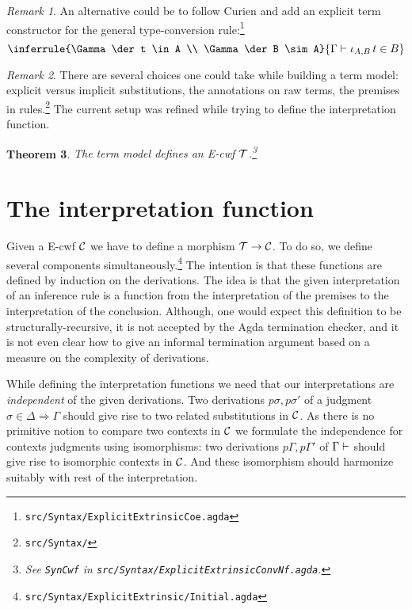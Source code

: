 \documentclass{amsart}
\theoremstyle{plain}
\newtheorem{theorem}{Theorem}[section]
\theoremstyle{definition}
\theoremstyle{remark}
\newtheorem{remark}[theorem]{Remark}
\begin{document}
\begin{remark}
  An alternative could be to follow Curien and add an explicit term
  constructor for the general type-conversion
  rule:\footnote{\texttt{src/Syntax/ExplicitExtrinsicCoe.agda}}
  \[
    \inferrule {\Gamma \der t \in A \\ \Gamma \der B \sim A}
    {\Gamma \der \iota_{A,B}\,t \in B}
  \]
\end{remark}

\begin{remark}
  There are several choices one could take while building a term
  model: explicit versus implicit substitutions, the annotations on
  raw terms, the premises in rules.\footnote{\texttt{src/Syntax/}} The
  current setup was refined while trying to define the interpretation
  function.
\end{remark}

\begin{theorem}
  The term model defines an E-cwf $\mathcal{T}$.\footnote{See \texttt{SynCwf}
    in \texttt{src/Syntax/ExplicitExtrinsicConvNf.agda}.}
\end{theorem}


\section{The interpretation function}
\label{sec:interpretation}

Given a E-cwf $\mathcal{C}$ we have to define a morphism $\mathcal{T} \to \mathcal{C}$.  To do
so, we define several components
simultaneously.\footnote{\texttt{src/Syntax/ExplicitExtrinsic/Initial.agda}}
The intention is that these functions are defined by induction on the
derivations.  The idea is that the given interpretation of an
inference rule is a function from the interpretation of the premises
to the interpretation of the conclusion.  Although, one would expect
this definition to be structurally-recursive, it is not accepted by
the Agda termination checker, and it is not even clear how to give an
informal termination argument based on a measure on the complexity of
derivations.

While defining the interpretation functions we need that our
interpretations are \emph{independent} of the given derivations.  Two
derivations $p\sigma, p\sigma'$ of a judgment $\sigma \in \Delta
\Rightarrow \Gamma$ should give rise to two related substitutions in
$\mathcal{C}$.  As there is no primitive notion to compare two contexts in $\mathcal{C}$
we formulate the independence for contexts judgments using
isomorphisms: two derivations $p\Gamma, p\Gamma'$ of $\Gamma \vdash$
should give rise to isomorphic contexts in $\mathcal{C}$.  And these
isomorphism should harmonize suitably with rest of the interpretation.
\end{document}
